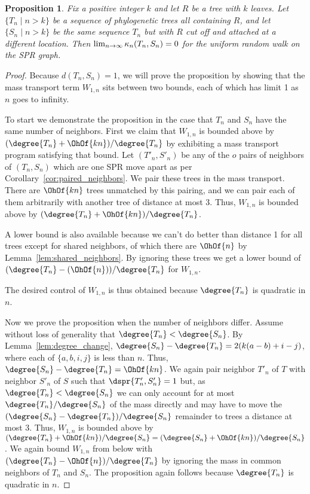 \documentclass{amsart}
\newtheorem{proposition}[theorem]{Proposition}
\newcommand{\curvature}[2][]{%
    \ifthenelse{\equal{#1}{}}%
		{\kappa_n(#2)}%
		{\kappa_n(#1;#2)}%
}
\begin{document}
\begin{proposition}
Fix a positive integer $k$ and let $R$ be a tree with $k$ leaves.
Let $\{T_n \mid n > k\}$ be a sequence of phylogenetic trees all containing $R$, and let $\{S_n \mid n > k\}$ be the same sequence $T_n$ but with $R$ cut off and attached at a different location.
Then $\lim_{n \rightarrow \infty} \curvature{T_n,S_n} = 0$ for the uniform random walk on the SPR graph.
\end{proposition}
\begin{proof}
Because $d(T_n, S_n) = 1$, we will prove the proposition by showing that the mass transport term $W_{1,n}$ sits between two bounds, each of which has limit 1 as $n$ goes to infinity.

To start we demonstrate the proposition in the case that $T_n$ and $S_n$ have the same number of neighbors.
First we claim that $W_{1,n}$ is bounded above by $(\degree{T_n}+\OhOf{kn})/\degree{T_n}$ by exhibiting a mass transport program satisfying that bound.
Let $(T'_n, S'_n)$ be any of the $o$ pairs of neighbors of $(T_n, S_n)$ which are one SPR move apart as per Corollary~\ref{cor:paired_neighbors}.
We pair these trees in the mass transport.
There are $\OhOf{kn}$ trees unmatched by this pairing, and we can pair each of them arbitrarily with another tree of distance at most 3.
Thus, $W_{1,n}$ is bounded above by $(\degree{T_n} + \OhOf{kn}) / \degree{T_n}$.

A lower bound is also available because we can't do better than distance 1 for all trees except for shared neighbors, of which there are $\OhOf{n}$ by Lemma~\ref{lem:shared_neighbors}.
By ignoring these trees we get a lower bound of $(\degree{T_n} - (\OhOf{n}))/\degree{T_n}$ for $W_{1,n}$.

The desired control of $W_{1,n}$ is thus obtained because $\degree{T_n}$ is quadratic in $n$.

Now we prove the proposition when the number of neighbors differ.
Assume without loss of generality that $\degree{T_n} < \degree{S_n}$.
By Lemma~\ref{lem:degree_change}, $\degree{S_n} - \degree{T_n} = 2(k(a-b) + i - j)$, where each of $\{a,b,i,j\}$ is less than $n$.
Thus, $\degree{S_n} - \degree{T_n} = \OhOf{kn}$.
We again pair neighbor $T'_n$ of $T$ with neighbor $S'_n$ of $S$ such that $\dspr{T'_n, S'_n}=1$ but, as $\degree{T_n} < \degree{S_n}$ we can only account for at most $\degree{T_n} / \degree{S_n}$ of the mass directly and may have to move the $(\degree{S_n} - \degree{T_n}) / \degree{S_n}$ remainder to trees a distance at most 3.
Thus, $W_{1,n}$ is bounded above by $(\degree{T_n} + \OhOf{kn}) / \degree{S_n} = (\degree{S_n} + \OhOf{kn}) / \degree{S_n}$.
We again bound $W_{1,n}$ from below with $(\degree{T_n} - \OhOf{n}) / \degree{T_n}$ by ignoring the mass in common neighbors of $T_n$ and $S_n$.
The proposition again follows because $\degree{T_n}$ is quadratic in $n$.

\end{proof}
\end{document}
